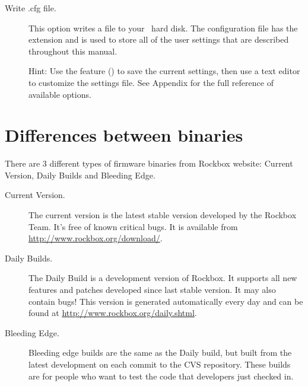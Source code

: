 \begin{description}
			\item [Write .cfg file.]This option writes a  file to 
			your \daps\ hard	disk.  The configuration file has the  
			extension and is used to store all of the user settings that are described 
			throughout this manual.
    
			Hint: Use the  feature () to save the current settings, then 
			use a text editor to customize the settings file. See Appendix 
			 for the full reference of available 
			options.

	\end{description}

\section{\label{ref:PartISection1}Differences between binaries}
There are 3 different types of firmware binaries from Rockbox website: 
Current Version, Daily Builds and Bleeding Edge.

\begin{description}
\item[Current Version.] The current version is the latest stable version
developed by the Rockbox Team. It's free of known critical bugs.  It is
available from \url{http://www.rockbox.org/download/}.
\item[Daily Builds.] The Daily Build is a development version of Rockbox. It
supports all new features and patches developed since last stable version. It
may also contain bugs! This version is generated automatically every day 
and can be found at \url{http://www.rockbox.org/daily.shtml}.
\item[Bleeding Edge.] Bleeding edge builds are the same as the Daily build, 
but built from the latest development on each commit to the CVS repository.
These builds are for people who want to test the code that developers just
checked in.
\end{description}

